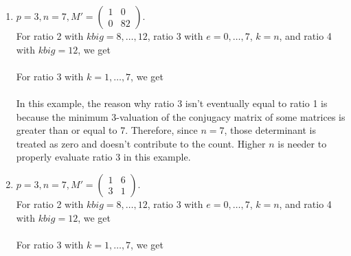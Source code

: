 \documentclass[letterpaper,12pt]{article}
\begin{document}
\begin{enumerate}
\item $p=3, n=7, M' = \begin{pmatrix}
1 & 0 \\ 0 & 82
\end{pmatrix}.$ \\
For ratio 2 with $kbig = 8, \dots, 12$, ratio 3 with $e = 0, \dots, 7$, $k=n$, and ratio 4 with $kbig = 12$, we get \\
 \\
For ratio 3 with $k = 1, \dots, 7$, we get \\
 \\

In this example, the reason why ratio 3 isn't eventually equal to ratio 1 
is because the minimum $3$-valuation of the conjugacy matrix of some matrices
is greater than or equal to 7.
Therefore, since $n=7$, those determinant is treated as zero and 
doesn't contribute to the count.
Higher $n$ is needer to properly evaluate ratio 3 in this example.

\item $p=3, n=7, M' = \begin{pmatrix}
1 & 6 \\ 3 & 1
\end{pmatrix}.$ \\
For ratio 2 with $kbig = 8, \dots, 12$, ratio 3 with $e = 0, \dots, 7$, $k=n$, and ratio 4 with $kbig = 12$, we get \\
 \\
For ratio 3 with $k = 1, \dots, 7$, we get \\
 \\


\end{enumerate}
\end{document}
